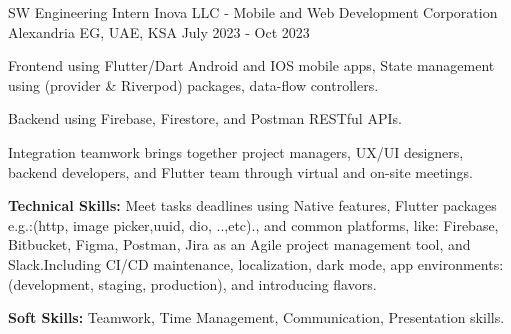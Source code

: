

\begin{cventries}

  \cventry
    {SW Engineering Intern} %
    {Inova LLC - Mobile and Web Development Corporation} %
    {Alexandria EG, UAE, KSA} %
    {July 2023 - Oct 2023} %
    {
      \begin{cvitems} %
        \item {Frontend using Flutter/Dart Android and IOS mobile apps, State management using 
        (provider \& Riverpod) packages, data-flow controllers.}
        \item {Backend using Firebase, Firestore, and Postman RESTful APIs.}
        \item {Integration teamwork brings together project managers, UX/UI designers, backend developers, and Flutter team through virtual and on-site meetings.}
        \item {\textbf{Technical Skills:} Meet tasks deadlines using Native features, Flutter packages e.g.:(http, image picker,uuid, dio, ..,etc)., and common platforms, like: Firebase, Bitbucket, Figma, Postman, Jira as an Agile project management tool, and Slack.Including CI/CD maintenance, localization, dark mode, app environments: (development, staging, production), and introducing flavors.}
        \item {\textbf{Soft Skills:} Teamwork, Time Management, Communication, Presentation skills.}
      \end{cvitems}
    }

\end{cventries}


